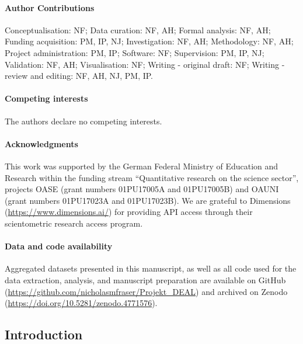 \documentclass[
]{article}
\begin{document}
\hypertarget{author-contributions}{%
\paragraph{Author Contributions}\label{author-contributions}}

Conceptualisation: NF; Data curation: NF, AH; Formal analysis: NF, AH; Funding acquisition: PM, IP, NJ; Investigation: NF, AH; Methodology: NF, AH; Project administration: PM, IP; Software: NF; Supervision: PM, IP, NJ; Validation: NF, AH; Visualisation: NF; Writing - original draft: NF; Writing - review and editing: NF, AH, NJ, PM, IP.

\hypertarget{competing-interests}{%
\paragraph{Competing interests}\label{competing-interests}}

The authors declare no competing interests.

\hypertarget{acknowledgments}{%
\paragraph{Acknowledgments}\label{acknowledgments}}

This work was supported by the German Federal Ministry of Education and Research within the
funding stream ``Quantitative research on the science sector'', projects OASE (grant numbers 01PU17005A and 01PU17005B) and OAUNI (grant numbers 01PU17023A and 01PU17023B). We are grateful to Dimensions (\url{https://www.dimensions.ai/}) for providing API access through their scientometric research access program.

\hypertarget{data-and-code-availability}{%
\paragraph{Data and code availability}\label{data-and-code-availability}}

Aggregated datasets presented in this manuscript, as well as all code used for the data extraction, analysis, and manuscript preparation are available on GitHub (\url{https://github.com/nicholasmfraser/Projekt_DEAL}) and archived on Zenodo (\url{https://doi.org/10.5281/zenodo.4771576}).

\pagebreak

\hypertarget{introduction}{%
\subsection{Introduction}\label{introduction}}
\end{document}
